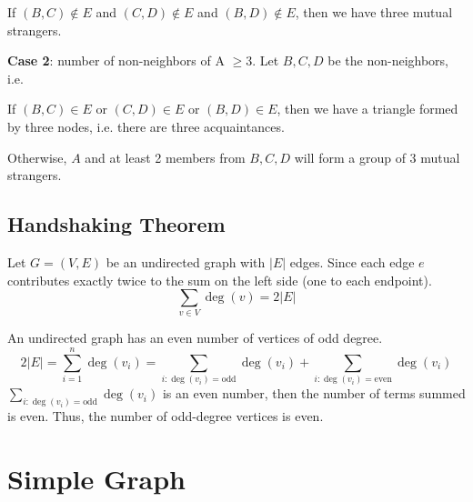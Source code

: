 \begin{eg}
  If \((B, C) \notin E\) and \((C, D) \notin E\) and \((B, D) \notin E\), then we have three mutual strangers. 

  \textbf{Case 2}: number of non-neighbors of A \(\geq 3\). Let \(B, C, D\) be the non-neighbors, i.e. 
  \begin{figure}[H]
    \centering
  \end{figure}

  If \((B, C) \in E\) or \((C, D) \in E\) or \((B, D) \in E\), then we have a triangle formed by three nodes, i.e. there are three acquaintances. 

  Otherwise, \(A\) and at least 2 members from \(B, C, D\) will form a group of 3 mutual strangers.
\end{eg}

\subsection{Handshaking Theorem}
\begin{theorem}
  Let \(G = (V, E)\) be an undirected graph with \(\vert E \vert\) edges. Since each edge \(e\) contributes exactly twice to the sum on the left side (one to each endpoint).
  \[
    \sum_{v \in V} \deg(v) = 2\vert E \vert
  \]
\end{theorem}

\begin{corollary}
  An undirected graph has an even number of vertices of odd degree.
  \[
    2\vert E \vert = \sum_{i = 1}^n \deg(v_i) = \sum_{i:\deg(v_i) = \text{odd}} \deg(v_i) + \sum_{i:\deg(v_i) = \text{even}} \deg(v_i)
  \]
  \(\sum_{i:\deg(v_i) = \text{odd}} \deg(v_i) \) is an even number, then the number of terms summed is even. Thus, the number of odd-degree vertices is even.
\end{corollary}

\section{Simple Graph}

